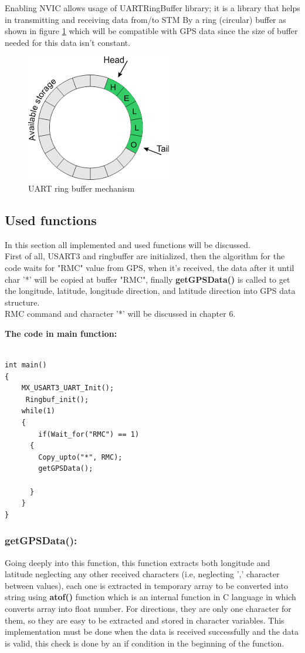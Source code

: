 Enabling NVIC allows usage of UARTRingBuffer library; it is a library that helps in transmitting and receiving data from/to STM By a ring (circular) buffer as shown in figure \ref{fig:uart-ring}  which will be compatible with GPS data since the size of buffer needed for this data isn't constant.

\begin{figure}[h]
    \centering
    \includegraphics[width = .4\textwidth]{figure/5_14.png}
    \caption{UART ring buffer mechanism}
    \label{fig:uart-ring}
    \end{figure}
\newpage 

\subsection{Used functions}

In this section all implemented and used functions will be discussed. \\ First of all, USART3 and ringbuffer are initialized, then the algorithm for the code waits for "RMC" value from GPS, when it's received, the data after it until char '*' will be copied at buffer "RMC", finally \textbf{getGPSData()} is called to get the longitude, latitude, longitude direction, and latitude direction into GPS data structure.\\ RMC command and character '*' will be discussed in chapter 6.

\textbf{The code in main function:}

\begin{lstlisting}

int main()
{
    MX_USART3_UART_Init();
     Ringbuf_init();
    while(1)
    {
        if(Wait_for("RMC") == 1)
	  {
	  	Copy_upto("*", RMC);
	  	getGPSData();

	  }
    }
}

\end{lstlisting}

\subsubsection{getGPSData():}
Going deeply into this function, this function extracts both longitude and latitude neglecting any other received characters (i.e, neglecting ',' character between values), each one is extracted in temporary array to be converted into string using \textbf{atof()} function which is an internal function in C language in which converts array into float number. For directions, they are only one character for them, so they are easy to be extracted and stored in character variables. This implementation must be done when the data is received successfully and the data is valid, this check is done by an if condition in the beginning of the function.

